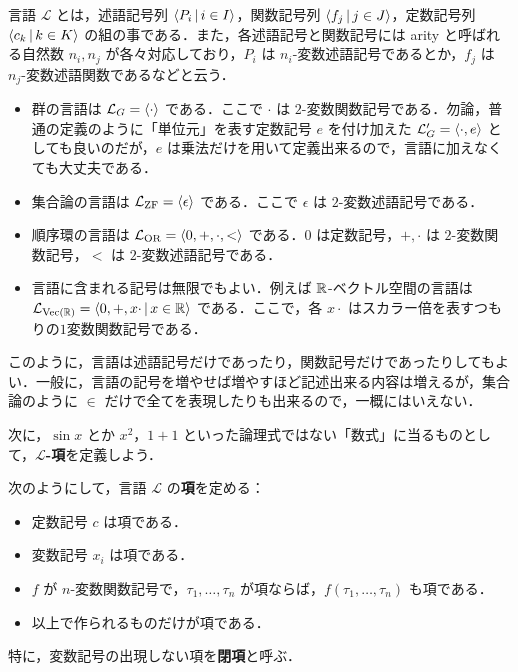 \documentclass[a4j]{jsarticle}
\begin{document}
\begin{definition}[言語]
 言語 $\mathcal{L}$ とは，述語記号列 $\Braket{P_i | i \in I}$，関数記号列 $\Braket{f_j | j \in J}$，定数記号列 $\Braket{c_k | k \in K}$ の組の事である．また，各述語記号と関数記号には arity と呼ばれる自然数 $n_i, n_j$ が各々対応しており，$P_i$ は $n_i$-変数述語記号であるとか，$f_j$ は $n_j$-変数述語関数であるなどと云う．
\end{definition}

\begin{example}
 \begin{itemize}
  \item 群の言語は $\mathcal{L}_G = \braket{ \cdot }$ である．ここで $\cdot$ は $2$-変数関数記号である．勿論，普通の定義のように「単位元」を表す定数記号 $e$ を付け加えた $\mathcal{L}_G' = \braket{ \cdot, e }$ としても良いのだが，$e$ は乗法だけを用いて定義出来るので，言語に加えなくても大丈夫である．
  \item 集合論の言語は $\mathcal{L}_{\mathrm{ZF}} = \Braket{ \epsilon }$ である．ここで $\epsilon$ は $2$-変数述語記号である．
  \item 順序環の言語は $\mathcal{L}_{\mathrm{OR}} = \Braket{ 0, +, \cdot, <}$ である．$0$ は定数記号，$+, \cdot$ は $2$-変数関数記号，$<$ は $2$-変数述語記号である．
  \item 言語に含まれる記号は無限でもよい．例えば $\mathbb{R}$-ベクトル空間の言語は $\mathcal{L}_{\mathrm{Vec}(\mathbb{R})} = \Braket{ 0, +, x\cdot | x \in \mathbb{R}}$ である．ここで，各 $x \cdot$ はスカラー倍を表すつもりの$1$変数関数記号である．
 \end{itemize}
\end{example}

このように，言語は述語記号だけであったり，関数記号だけであったりしてもよい．一般に，言語の記号を増やせば増やすほど記述出来る内容は増えるが，集合論のように $\in$ だけで全てを表現したりも出来るので，一概にはいえない．

次に，$\sin x$ とか $x^2$，$1+1$ といった論理式ではない「数式」に当るものとして，{\bfseries $\mathcal{L}$-項}を定義しよう．

\begin{definition}[項]
 次のようにして，言語 $\mathcal{L}$ の{\bfseries 項}を定める：
 \begin{itemize}
  \item 定数記号 $c$ は項である．
  \item 変数記号 $x_i$ は項である．
  \item $f$ が $n$-変数関数記号で，$\tau_1, \dots, \tau_n$ が項ならば，$f(\tau_1, \dots, \tau_n)$ も項である．
  \item 以上で作られるものだけが項である．
 \end{itemize}
 特に，変数記号の出現しない項を{\bfseries 閉項}と呼ぶ．
\end{definition}
\end{document}
